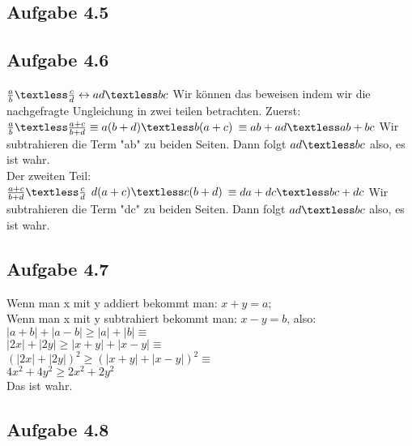 \documentclass{standalone}
\begin{document}
 

\subsection{Aufgabe 4.5}

\subsection{Aufgabe 4.6}
$\frac{a}{b} \textless \frac{c}{d} \leftrightarrow ad \textless bc$ Wir können das beweisen indem wir die nachgefragte Ungleichung in zwei teilen betrachten. Zuerst: \\
$\frac{a}{b} \textless \frac{a+c}{b+d} \equiv a(b+d) \textless b(a+c)$
$\equiv ab+ad \textless ab+bc$ Wir subtrahieren die Term "ab" zu beiden Seiten. Dann folgt $ ad \textless bc$ also, es ist wahr.\\

Der zweiten Teil:\\
$\frac{a+c}{b+d} \textless \frac{c}{d}$
$d(a+c) \textless c(b+d)$
$\equiv da+dc \textless bc+dc $ Wir subtrahieren die Term "dc" zu beiden Seiten. Dann folgt $ ad \textless bc$ also, es ist wahr.\\

\subsection{Aufgabe 4.7}
Wenn man x mit y addiert bekommt man: $x+y=a$;\\
Wenn man x mit y subtrahiert bekommt man: $x-y=b$, also:\\
$|a+b|+|a-b| \ge |a|+|b| \equiv $\\
$|2x|+|2y| \ge |x+y|+|x-y| \equiv$\\
$(|2x|+|2y|)^2 \ge (|x+y|+|x-y|)^2 \equiv$\\
$4x^2 + 4y^2 \ge 2x^2 + 2y^2$\\
Das ist wahr.

\subsection{Aufgabe 4.8}
\end{document}
